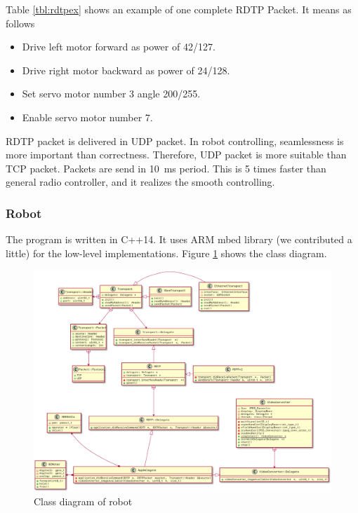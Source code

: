 \documentclass[journal]{IEEEtran}
\begin{document}
Table \ref{tbl:rdtpex} shows an example of one complete RDTP Packet.
It means as follows
\begin{itemize}
    \item Drive left motor forward as power of 42/127.
    \item Drive right motor backward as power of 24/128.
    \item Set servo motor number 3 angle 200/255.
    \item Enable servo motor number 7.
\end{itemize}

RDTP packet is delivered in UDP packet.
In robot controlling, seamlessness is more important than correctness.
Therefore, UDP packet is more suitable than TCP packet.
Packets are send in \SI{10}{\ms} period.
This is 5 times faster than general radio controller, and it realizes the smooth controlling.

\subsubsection{Robot}
The program is written in C++14.
It uses ARM mbed library (we contributed a little) for the low-level implementations.
Figure \ref{fig:class_robot} shows the class diagram.
\begin{figure}
    \centering
    \includegraphics[width=1.0\textwidth]{robotClass.pdf}
    \caption{Class diagram of robot} \label{fig:class_robot}
\end{figure}
\end{document}
